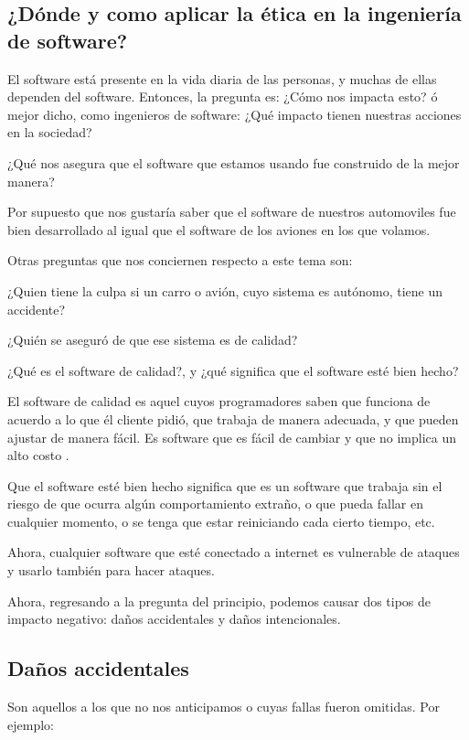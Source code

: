 \documentclass[twoside]{article}
\begin{document}
\begin{multicols}{2}
\section{¿Dónde y como aplicar la ética en la ingeniería de software?}

El software está presente en la vida diaria de las personas, y muchas de ellas
dependen del software. Entonces, la pregunta es: ¿Cómo nos impacta esto? ó mejor
dicho, como ingenieros de software: ¿Qué impacto tienen nuestras acciones en la
sociedad?

¿Qué nos asegura que el software que estamos usando fue construido de la mejor
manera?

Por supuesto que nos gustaría saber que el software de nuestros automoviles fue
bien desarrollado al igual que el software de los aviones en los que volamos.

Otras preguntas que nos conciernen respecto a este tema son:

¿Quien tiene la culpa si un carro o avión, cuyo sistema es autónomo, tiene un
accidente?

¿Quién se aseguró de que ese sistema es de calidad?

¿Qué es el software de calidad?, y ¿qué significa que el software esté bien hecho?

El software de calidad es aquel cuyos programadores saben que funciona de
acuerdo a lo que él cliente pidió, que trabaja de manera adecuada, y que pueden
ajustar de manera fácil. Es software que es fácil de cambiar y que no implica un
alto costo \cite{CMartin2022EthicsManifesto}.

Que el software esté bien hecho significa que es un software que trabaja sin el
riesgo de que ocurra algún comportamiento extraño, o que pueda fallar en
cualquier momento, o se tenga que estar reiniciando cada cierto tiempo, etc.

Ahora, cualquier software que esté conectado a internet es vulnerable de ataques
y usarlo también para hacer ataques.

Ahora, regresando a la pregunta del principio, podemos causar dos tipos de
impacto negativo: daños accidentales y daños intencionales.

\subsection{Daños accidentales}

Son aquellos a los que no nos anticipamos o cuyas fallas fueron omitidas. Por
ejemplo:


\end{multicols}
\end{document}

